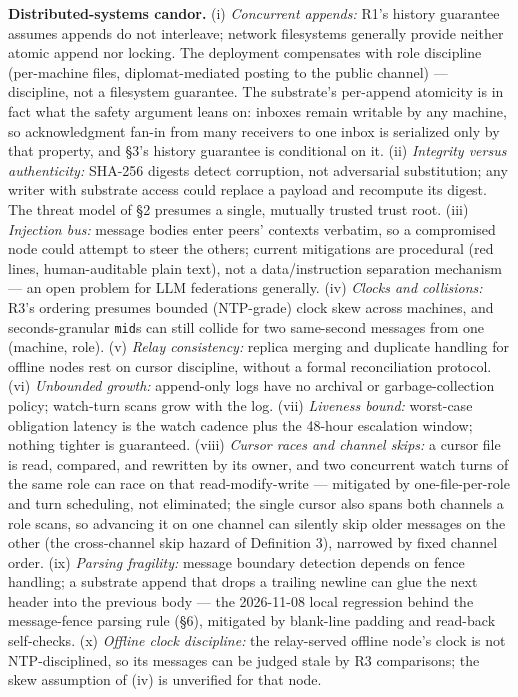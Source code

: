 \documentclass[journal]{IEEEtran}
\begin{document}
\textbf{Distributed-systems candor.} (i) \emph{Concurrent appends:} R1's
history guarantee assumes appends do not interleave; network filesystems
generally provide neither atomic append nor locking. The deployment
compensates with role discipline (per-machine files, diplomat-mediated
posting to the public channel) --- discipline, not a filesystem
guarantee. The substrate's per-append atomicity is in fact what the
safety argument leans on: inboxes remain writable by any machine, so
acknowledgment fan-in from many receivers to one inbox is serialized
only by that property, and §3's history guarantee is conditional on it.
(ii) \emph{Integrity versus authenticity:} SHA-256 digests detect
corruption, not adversarial substitution; any writer with substrate
access could replace a payload and recompute its digest. The threat
model of §2 presumes a single, mutually trusted trust root. (iii)
\emph{Injection bus:} message bodies enter peers' contexts verbatim, so
a compromised node could attempt to steer the others; current
mitigations are procedural (red lines, human-auditable plain text), not
a data/instruction separation mechanism --- an open problem for LLM
federations generally. (iv) \emph{Clocks and collisions:} R3's ordering
presumes bounded (NTP-grade) clock skew across machines, and
seconds-granular \texttt{mid}s can still collide for two same-second
messages from one (machine, role). (v) \emph{Relay consistency:} replica
merging and duplicate handling for offline nodes rest on cursor
discipline, without a formal reconciliation protocol. (vi)
\emph{Unbounded growth:} append-only logs have no archival or
garbage-collection policy; watch-turn scans grow with the log. (vii)
\emph{Liveness bound:} worst-case obligation latency is the watch
cadence plus the 48-hour escalation window; nothing tighter is
guaranteed. (viii) \emph{Cursor races and channel skips:} a cursor file
is read, compared, and rewritten by its owner, and two concurrent watch
turns of the same role can race on that read-modify-write --- mitigated
by one-file-per-role and turn scheduling, not eliminated; the single
cursor also spans both channels a role scans, so advancing it on one
channel can silently skip older messages on the other (the cross-channel
skip hazard of Definition 3), narrowed by fixed channel order. (ix)
\emph{Parsing fragility:} message boundary detection depends on fence
handling; a substrate append that drops a trailing newline can glue the
next header into the previous body --- the 2026-11-08 local regression
behind the message-fence parsing rule (§6), mitigated by blank-line
padding and read-back self-checks. (x) \emph{Offline clock discipline:}
the relay-served offline node's clock is not NTP-disciplined, so its
messages can be judged stale by R3 comparisons; the skew assumption of
(iv) is unverified for that node.
\end{document}
